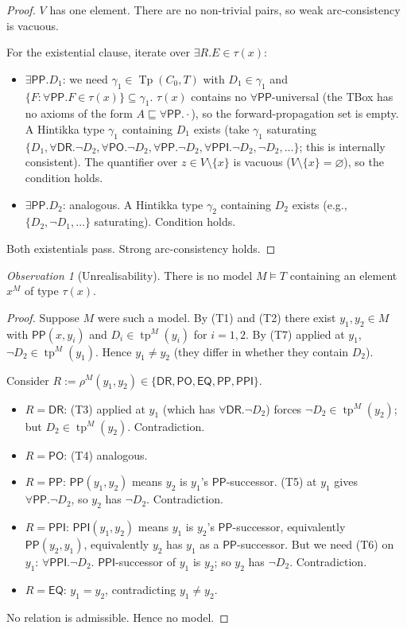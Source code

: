 \documentclass[11pt]{article}
\theoremstyle{definition}
\theoremstyle{remark}
\newtheorem{observation}[theorem]{Observation}
\newcommand{\DR}{\mathsf{DR}}
\newcommand{\PO}{\mathsf{PO}}
\newcommand{\PP}{\mathsf{PP}}
\newcommand{\PPI}{\mathsf{PPI}}
\newcommand{\EQ}{\mathsf{EQ}}
\newcommand{\RCCall}{\{\DR,\PO,\EQ,\PP,\PPI\}}
\newcommand{\Tp}{\operatorname{Tp}}
\newcommand{\tp}{\operatorname{tp}}
\begin{document}
\begin{proof}
$V$ has one element.  There are no non-trivial pairs, so weak
arc-consistency is vacuous.

For the existential clause, iterate over $\exists R. E \in \tau(x)$:
\begin{itemize}
  \item $\exists \PP. D_1$: we need $\gamma_1 \in \Tp(C_0, T)$ with
    $D_1 \in \gamma_1$ and $\{F : \forall \PP. F \in \tau(x)\}
    \subseteq \gamma_1$.  $\tau(x)$ contains no $\forall \PP$-universal
    (the TBox has no axioms of the form $A \sqsubseteq \forall \PP.
    \cdot$), so the forward-propagation set is empty.  A Hintikka
    type $\gamma_1$ containing $D_1$ exists (take $\gamma_1$
    saturating $\{D_1, \forall \DR. \neg D_2, \forall \PO. \neg D_2,
    \forall \PP. \neg D_2, \forall \PPI. \neg D_2, \neg D_2, \ldots\}$;
    this is internally consistent).  The quantifier over
    $z \in V \setminus \{x\}$ is vacuous ($V \setminus \{x\} =
    \varnothing$), so the condition holds.
  \item $\exists \PP. D_2$: analogous.  A Hintikka type $\gamma_2$
    containing $D_2$ exists (e.g., $\{D_2, \neg D_1, \ldots\}$
    saturating).  Condition holds.
\end{itemize}
Both existentials pass.  Strong arc-consistency holds.
\end{proof}

\begin{observation}[Unrealisability]
\label{obs:unrealisable-one}
There is no model $M \models T$ containing an element $x^M$ of
type $\tau(x)$.
\end{observation}

\begin{proof}
Suppose $M$ were such a model.  By (T1) and (T2) there exist $y_1,
y_2 \in M$ with $\PP(x, y_i)$ and $D_i \in \tp^M(y_i)$ for $i = 1,
2$.  By (T7) applied at $y_1$, $\neg D_2 \in \tp^M(y_1)$.  Hence
$y_1 \neq y_2$ (they differ in whether they contain $D_2$).

Consider $R := \rho^M(y_1, y_2) \in \RCCall$.
\begin{itemize}
  \item $R = \DR$: (T3) applied at $y_1$ (which has $\forall \DR.
    \neg D_2$) forces $\neg D_2 \in \tp^M(y_2)$; but $D_2 \in
    \tp^M(y_2)$.  Contradiction.
  \item $R = \PO$: (T4) analogous.
  \item $R = \PP$: $\PP(y_1, y_2)$ means $y_2$ is $y_1$'s
    $\PP$-successor.  (T5) at $y_1$ gives $\forall \PP. \neg D_2$,
    so $y_2$ has $\neg D_2$.  Contradiction.
  \item $R = \PPI$: $\PPI(y_1, y_2)$ means $y_1$ is $y_2$'s
    $\PP$-successor, equivalently $\PP(y_2, y_1)$, equivalently
    $y_2$ has $y_1$ as a $\PP$-successor.  But we need (T6) on
    $y_1$: $\forall \PPI. \neg D_2$.  $\PPI$-successor of $y_1$ is
    $y_2$; so $y_2$ has $\neg D_2$.  Contradiction.
  \item $R = \EQ$: $y_1 = y_2$, contradicting $y_1 \neq y_2$.
\end{itemize}
No relation is admissible.  Hence no model.
\end{proof}
\end{document}
